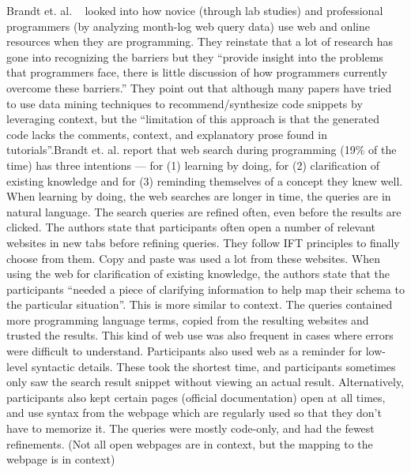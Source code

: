 Brandt et. al. ~\cite{Brandt:2009} looked into how novice (through lab studies) and professional programmers (by analyzing month-log web query data) use web and online resources when they are programming. They reinstate that a lot of research has gone into recognizing the barriers but they ``provide insight into the problems that programmers face, there is little discussion of how programmers currently overcome these barriers.'' They point out that although many papers have tried to use data mining techniques to recommend/synthesize code snippets by leveraging context, but the ``limitation of this approach is that the generated code lacks the comments, context, and explanatory prose found in tutorials''.Brandt et. al. report that web search during programming (19\% of the time) has three intentions --- for (1) learning by doing, for (2) clarification of existing knowledge and for (3) reminding themselves of a concept they knew well. When learning by doing, the web searches are longer in time, the queries are in natural language. The search queries are refined often, even before the results are clicked. The authors state that participants often open a number of relevant websites in new tabs before refining queries. They follow IFT principles to finally choose from them. Copy and paste was used a lot from these websites. When using the web for clarification of existing knowledge, the authors state that the participants ``needed a piece of clarifying information to help map their schema to the particular situation''. This is more similar to context. The queries contained more programming language terms, copied from the resulting websites and trusted the results. This kind of web use was also frequent in cases where errors were difficult to understand. Participants also used web as a reminder for low-level syntactic details. These took the shortest time, and participants sometimes only saw the search result snippet without viewing an actual result. Alternatively, participants also kept certain pages (official documentation) open at all times, and use syntax from the webpage which are regularly used so that they don't have to memorize it. The queries were mostly code-only, and had the fewest refinements. (Not all open webpages are in context, but the mapping to the webpage is in context) 

